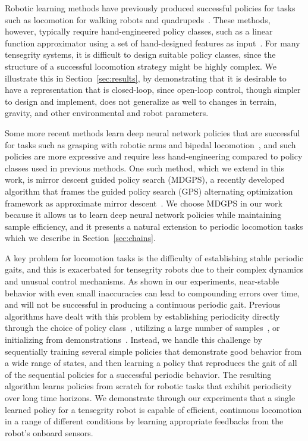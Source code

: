 Robotic learning methods have previously produced successful policies for tasks
such as locomotion for walking robots and
quadrupeds~\cite{tzs-spgrl-04,kp-pgrlf-04,cspd-bolg-15,kn-ldquad-11,kbps-temp-09}.
These methods, however, typically require hand-engineered policy classes, such
as a linear function approximator using a set of hand-designed features as
input~\cite{tzs-spgrl-04}.  For many tensegrity systems, it is difficult to
design suitable policy classes, since the structure of a successful locomotion
strategy might be highly complex. We illustrate this in
Section~\ref{sec:results}, by demonstrating that it is desirable to have a
representation that is closed-loop, since open-loop control, though simpler to
design and implement, does not generalize as well to changes in terrain,
gravity, and other environmental and robot parameters.

Some more recent methods learn deep neural network policies that are successful
for tasks such as grasping with robotic arms and bipedal
locomotion~\cite{slmja-trpo-15,lhphe-ccdrl-16}, and such policies are more
expressive and require less hand-engineering compared to policy classes used in
previous methods. One such method, which we extend in this work, is mirror
descent guided policy search (MDGPS), a recently developed algorithm that frames
the guided policy search (GPS) alternating optimization framework as approximate
mirror descent~\cite{ml-gpsam-16}. We choose MDGPS in our work because it allows
us to learn deep neural network policies while maintaining sample efficiency,
and it presents a natural extension to periodic locomotion tasks which we
describe in Section~\ref{sec:chains}.

A key problem for locomotion tasks is the difficulty of establishing stable
periodic gaits, and this is exacerbated for tensegrity robots due to their
complex dynamics and unusual control mechanisms. As shown in our experiments,
near-stable behavior with even small inaccuracies can lead to compounding errors
over time, and will not be successful in producing a continuous periodic gait.
Previous algorithms have dealt with this problem by establishing periodicity
directly through the choice of policy
class~\cite{kp-pgrlf-04,gpw-fbwrc-06,emmnc-cpg-08}, utilizing a large number of
samples~\cite{slmja-trpo-15}, or initializing from
demonstrations~\cite{lk-gps-13,la-lnnpg-14}. Instead, we handle this challenge
by sequentially training several simple policies that demonstrate good behavior
from a wide range of states, and then learning a policy that reproduces the gait
of all of the sequential policies for a successful periodic behavior. The
resulting algorithm learns policies from scratch for robotic tasks that exhibit
periodicity over long time horizons. We demonstrate through our experiments that
a single learned policy for a tensegrity robot is capable of efficient,
continuous locomotion in a range of different conditions by learning appropriate
feedbacks from the robot's onboard sensors.


